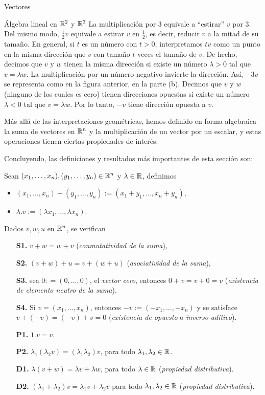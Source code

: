 \begin{chapter}{Vectores}
\begin{section}{\'Algebra lineal en $\mathbb R^2$ y $\mathbb R^3$}
     La multiplicación por 3 equivale a ``estirar'' $v$ por 3. Del mismo modo, $\frac12v$ 	equivale a estirar $v$ en $\frac12$, es decir, reducir $v$ a la mitad de su tamaño. En general, si $t$ es un número con $t> 0$, interpretamos $tv$ como un punto en la misma dirección que $v$ con tamaño  $t$-veces el tamaño de $v$.  De hecho, decimos que $v$ y $w$ tienen la misma dirección si existe un número $\lambda> 0$ tal que $v = \lambda w$. La multiplicación por un número negativo invierte la dirección. Así, $-3 v$ se representa como en la figura anterior, en la parte (b). Decimos que $v$ y $w$  (ninguno de los cuales es cero) tienen direcciones opuestas si existe un número $\lambda <0$ tal que $v =\lambda w$. Por lo tanto, $-v$ tiene dirección opuesta a $v$.

        
Más allá de las interpretaciones geométricas,  hemos definido  en forma algebraica la suma de vectores en $\mathbb R^n$ y  la multiplicación de un vector por un escalar,  y estas operaciones tienen ciertas propiedades de interés. 

Concluyendo, las definiciones y resultados más importantes de esta sección son:


Sean  $(x_1,\ldots,x_n), (y_1,\ldots,y_n) \in \mathbb R^n$ y $\lambda \in \mathbb R$, definimos
    \begin{itemize}
        \item $(x_1,\ldots,x_n)+ (y_1,\ldots,y_n):=(x_1+y_1,\ldots,x_n+y_n)$, 
        \item $\lambda.v := (\lambda x_1,\ldots,\lambda x_n)$.
    \end{itemize}
Dados  $v,w,u$ en $\mathbb R^n$,  se verifican

    \begin{enumerate}
        \item[\textbf{S1.}] $v + w = w + v$ (\textit{conmutatividad de la suma}),
        \item[\textbf{S2.}] $(v+ w)+ u = v + (w+u)$ (\textit{asociatividad de la suma}),
        \item[\textbf{S3.}] sea $0: =(0,\ldots, 0)$, el \textit{vector cero}, entonces $0+ v = v + 0 =v$ (\textit{existencia de elemento neutro de la suma}).
        \item[\textbf{S4.}] Si $v =(x_1,\ldots,x_n)$, entonces $-v:=(-x_1,\ldots,-x_n)$ y se satisface  $v + (-v) = (-v)+ v =0$ (\textit{existencia de opuesto} o  \textit{inverso aditivo}).
        \item[\textbf{P1.}] $1.v=v$.
        \item[\textbf{P2.}] $\lambda_1(\lambda_2v) = (\lambda_1\lambda_2)v$, para todo $\lambda_1,\lambda_2 \in \mathbb R$.
        \item[\textbf{D1.}] $\lambda(v+w) = \lambda v +\lambda w$, para todo $\lambda \in \mathbb R$  (\textit{propiedad distributiva}).
        \item[\textbf{D2.}] $(\lambda_1+\lambda_2)v = \lambda_1v + \lambda_2 v$ para todo $\lambda_1,\lambda_2 \in \mathbb R$  (\textit{propiedad distributiva}).
    \end{enumerate}






\end{section}
\end{chapter}
